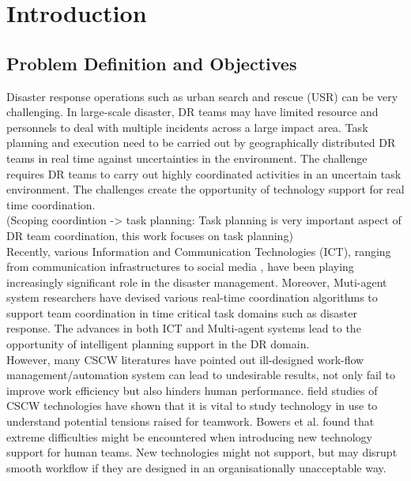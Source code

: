 \chapter{Introduction}\label{ch:introduction}
 


\section{Problem Definition and Objectives}
Disaster response operations such as urban search and rescue (USR) can be very challenging. In large-scale disaster, DR teams may have limited resource and personnels to deal with multiple incidents across a large impact area. Task planning and execution need to be carried out by geographically distributed DR teams in real time against uncertainties in the environment. The challenge requires DR teams to carry out highly coordinated activities in an uncertain task environment. The challenges create the opportunity of technology support for real time coordination.  \\ 

(Scoping coordintion -> task planning:  Task planning is very important aspect of DR team coordination, this work focuses on task planning)\\

Recently, various Information and Communication Technologies (ICT), ranging from communication infrastructures to social media , have been playing increasingly significant role in the disaster management.  Moreover, Muti-agent system researchers have devised various real-time coordination algorithms to support team coordination in time critical task domains such as disaster response. The advances in both ICT and Multi-agent systems lead to the opportunity of intelligent planning support in the DR domain.\\

However, many CSCW literatures have pointed out ill-designed work-flow management/automation system can lead to undesirable results, not only fail to improve work efficiency but also hinders human performance. field studies of CSCW technologies have shown that it is vital to study technology in use to understand potential tensions raised for teamwork. Bowers et al. found that extreme difficulties might be encountered when introducing new technology support for human teams. New technologies might not support, but may disrupt smooth workflow if they are designed in an organisationally unacceptable way. \\

